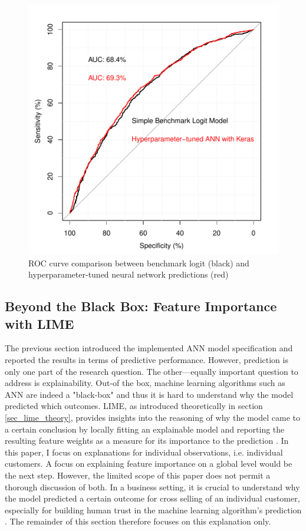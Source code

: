 \documentclass[12pt,a4paper]{article}
\begin{document}
\begin{figure}[ht]
	\centering
  \includegraphics[scale=0.63]{figures/roc_auc_comp.pdf}
	\caption{ROC curve comparison between benchmark logit (black) and hyperparameter-tuned neural network predictions (red)}
	\label{fig_roc}
\end{figure}


\subsection{Beyond the Black Box: Feature Importance with LIME}
The previous section introduced the implemented ANN model specification and reported the results in terms of predictive performance.
However, prediction is only one part of the research question.
The other---equally important question to address is explainability.
Out-of the box, machine learning algorithms such as ANN are indeed a "black-box" and thus it is hard to understand why the model predicted which outcomes.
LIME, as introduced theoretically in section \ref{sec_lime_theory}, provides insights into the reasoning of why the model came to a certain
conclusion by locally fitting an explainable model and reporting the resulting feature weights as a measure for its importance to the prediction \citep{ribeiroWhyShouldTrust2016a}.
In this paper, I focus on explanations for individual observations, i.e. individual customers.
A focus on explaining feature importance on a global level would be the next step.
However, the limited scope of this paper does not permit a thorough discussion of both.
In a business setting, it is crucial to understand why the model predicted a certain outcome for cross selling of an individual customer, especially for building human trust in the machine learning algorithm's prediction \citep{ribeiroWhyShouldTrust2016a}.
The remainder of this section therefore focuses on this explanation only.
\end{document}
